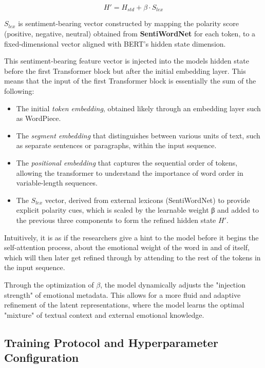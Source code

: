 \documentclass[a4paper,12pt]{article}
\begin{document}
\begin{equation}
    H' = H_{std} + \beta \cdot S_{lex}
\end{equation}

$S_{lex}$ is sentiment-bearing vector constructed by mapping the polarity score (positive, negative, neutral) obtained from \textbf{SentiWordNet} for each token, to a fixed-dimensional vector aligned with BERT’s hidden state dimension.

This sentiment-bearing feature vector is injected into the models hidden state before the first Transformer block but after the initial embedding layer. This means that the input of the first Transformer block is essentially the sum of the following:

\begin{itemize}
    \item The initial \textit{token embedding}, obtained likely through an embedding layer such as WordPiece.
    \item The \textit{segment embedding} that distinguishes between various units of text, such as separate sentences or paragraphs, within the input sequence.
    \item The \textit{positional embedding} that captures the sequential order of tokens, allowing the transformer to understand the importance of word order in variable-length sequences.
    \item The $S_{lex}$ vector, derived from external lexicons (SentiWordNet) to provide explicit polarity cues, which is scaled by the learnable weight β and added to the previous three components to form the refined hidden state $H'$.
\end{itemize}

Intuitively, it is as if the researchers give a hint to the model before it begins the self-attention process, about the emotional weight of the word in and of itself, which will then later get refined through by attending to the rest of the tokens in the input sequence.

Through the optimization of $\beta$, the model dynamically adjusts the "injection strength" of emotional metadata. This allows for a more fluid and adaptive refinement of the latent representations, where the model learns the optimal "mixture" of textual context and external emotional knowledge.

\subsection{Training Protocol and Hyperparameter Configuration}
\end{document}
